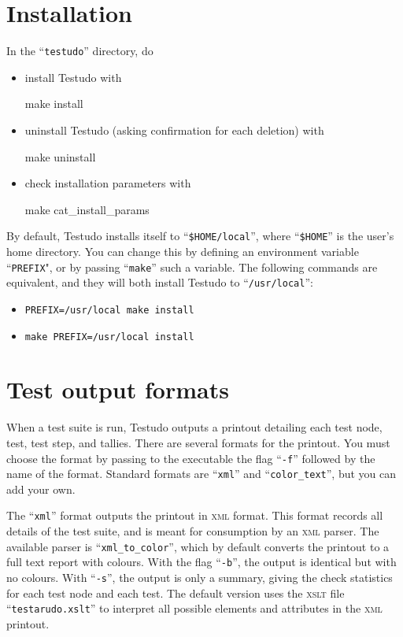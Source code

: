 \documentclass[twoside, a4paper, article]{memoir}
\begin{document}
\mainmatter


\chapter{Installation}

In the ``\texttt{testudo}'' directory, do
\begin{itemize}
\item install Testudo with
\begin{bashlisting}
make install
\end{bashlisting}
\item uninstall Testudo (asking confirmation for each deletion) with
\begin{bashlisting}
make uninstall
\end{bashlisting}
\item check installation parameters with
\begin{bashlisting}
make cat_install_params
\end{bashlisting}
\end{itemize}

By default, Testudo installs itself to ``\texttt{\$HOME/local}'', where
``\texttt{\$HOME}'' is the user's home directory.  You can change this by
defining an environment variable ``\texttt{PREFIX}", or by passing
``\texttt{make}'' such a variable.  The following commands are equivalent, and
they will both install Testudo to ``\texttt{/usr/local}'':
\begin{itemize}
\item \texttt{PREFIX=/usr/local make install}
\item \texttt{make PREFIX=/usr/local install}
\end{itemize}


\chapter{Test output formats}
\label{cha:test-output-formats}

When a test suite is run, Testudo outputs a printout detailing each test node,
test, test step, and tallies.  There are several formats for the printout.  You
must choose the format by passing to the executable the flag ``\texttt{-f}''
followed by the name of the format.  Standard formats are ``\texttt{xml}'' and
``\texttt{color\_text}'', but you can add your own.

The ``\texttt{xml}'' format outputs the printout in \textsc{xml} format.  This
format records all details of the test suite, and is meant for consumption by
an \textsc{xml} parser.  The available parser is ``\texttt{xml\_to\_color}'',
which by default converts the printout to a full text report with colours.
With the flag ``\texttt{-b}'', the output is identical but with no colours.
With ``\texttt{-s}'', the output is only a summary, giving the check statistics
for each test node and each test.  The default version uses the \textsc{xslt}
file ``\texttt{testarudo.xslt}'' to interpret all possible elements and
attributes in the \textsc{xml} printout.
\end{document}

